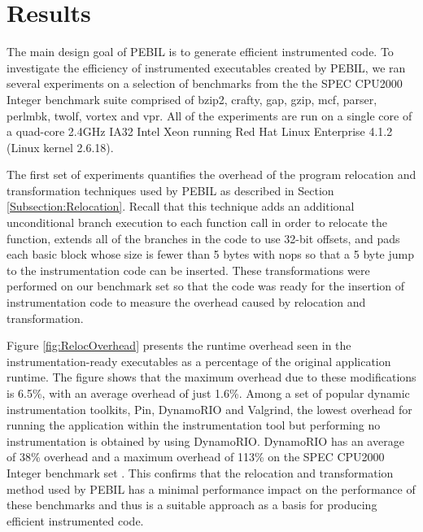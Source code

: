 \section{Results}
\label{sec:Results}

The main design goal of PEBIL is to generate efficient instrumented code. To
investigate the efficiency of instrumented executables created by PEBIL, we ran
several experiments on a selection of benchmarks from the the SPEC CPU2000
Integer benchmark suite comprised of bzip2, crafty, gap, gzip, mcf, parser,
perlmbk, twolf, vortex and vpr. All of the experiments are run on a single core
of a quad-core 2.4GHz IA32 Intel Xeon running Red Hat Linux Enterprise 4.1.2
(Linux kernel 2.6.18). 

The first set of experiments quantifies the overhead of the program relocation
and transformation techniques used by PEBIL as described in Section
\ref{Subsection:Relocation}. Recall that this technique adds an additional
unconditional branch execution to each function call in order to relocate the
function, extends all of the branches in the code to use 32-bit offsets, and
pads each basic block whose size is fewer than 5 bytes with nops so that a 5
byte jump to the instrumentation code can be inserted. These transformations were
performed on our benchmark set so that the code was ready for the insertion of
instrumentation code to measure the overhead caused by relocation and transformation. 

Figure \ref{fig:RelocOverhead} presents the runtime overhead seen in the
instrumentation-ready executables as a percentage of the original application
runtime. The figure shows that the maximum overhead due to these modifications
is 6.5\%, with an average overhead of just 1.6\%. Among a set of popular dynamic
instrumentation toolkits, Pin, DynamoRIO and Valgrind, the lowest overhead for
running the application within the instrumentation tool but performing no
instrumentation is obtained by using DynamoRIO. DynamoRIO has an average of 38\%
overhead and a maximum overhead of 113\% on the SPEC CPU2000 Integer benchmark
set \cite{luk2005pin}. This confirms that the relocation and transformation
method used by PEBIL has a minimal performance impact on the performance of
these benchmarks and thus is a suitable approach as a basis for producing
efficient instrumented code.

